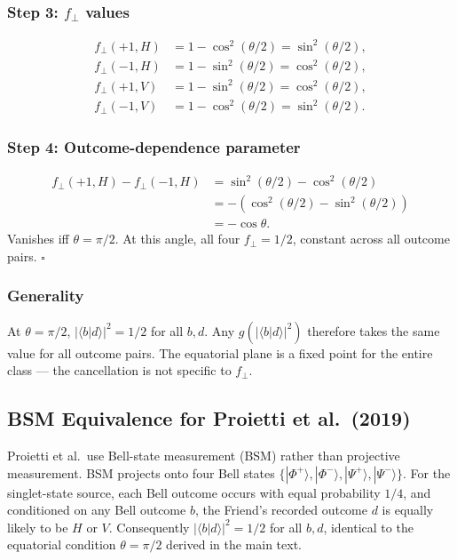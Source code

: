 \documentclass[12pt]{article}
\begin{document}
\subsubsection*{Step 3: $f_\perp$ values}
\begin{align}
f_\perp(+1,H) &= 1 - \cos^2(\theta/2) = \sin^2(\theta/2),\\
f_\perp(-1,H) &= 1 - \sin^2(\theta/2) = \cos^2(\theta/2),\\
f_\perp(+1,V) &= 1 - \sin^2(\theta/2) = \cos^2(\theta/2),\\
f_\perp(-1,V) &= 1 - \cos^2(\theta/2) = \sin^2(\theta/2).
\end{align}

\subsubsection*{Step 4: Outcome-dependence parameter}
\begin{align}
f_\perp(+1, H) - f_\perp(-1, H) &= \sin^2(\theta/2) - \cos^2(\theta/2)\\
&= -( \cos^2(\theta/2) - \sin^2(\theta/2))\\
&= -\cos\theta.
\end{align}
Vanishes iff $\theta = \pi/2$. At this angle, all four $f_\perp = 1/2$, constant across all outcome pairs. $\square$

\subsubsection*{Generality}
At $\theta = \pi/2$, $|\langle b|d\rangle|^2 = 1/2$ for all $b,d$. Any $g(|\langle b|d\rangle|^2)$ therefore takes the same value for all outcome pairs. The equatorial plane is a fixed point for the entire class --- the cancellation is not specific to $f_\perp$.

\subsection{BSM Equivalence for Proietti et al.\ (2019)}

Proietti et al.\ use Bell-state measurement (BSM) rather than projective measurement. BSM projects onto four Bell states $\{|\Phi^+\rangle, |\Phi^-\rangle, |\Psi^+\rangle, |\Psi^-\rangle\}$. For the singlet-state source, each Bell outcome occurs with equal probability $1/4$, and conditioned on any Bell outcome $b$, the Friend's recorded outcome $d$ is equally likely to be $H$ or $V$. Consequently $|\langle b|d\rangle|^2 = 1/2$ for all $b,d$, identical to the equatorial condition $\theta = \pi/2$ derived in the main text.
\end{document}
